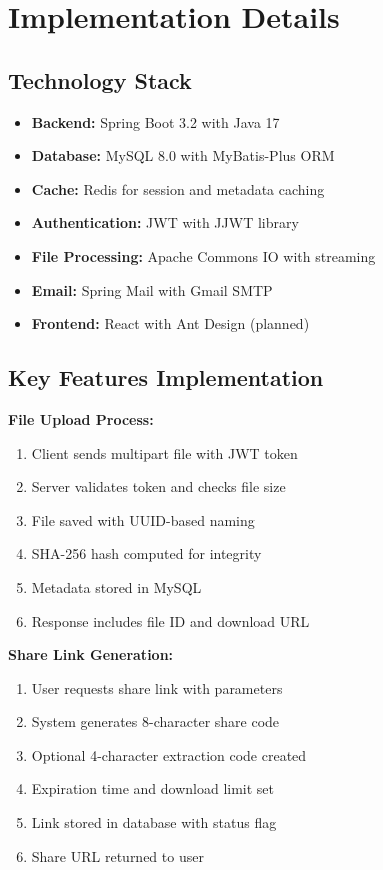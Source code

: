 \documentclass[final]{cvpr}
\begin{document}
\section{Implementation Details}

\subsection{Technology Stack}
\begin{itemize}
    \item \textbf{Backend:} Spring Boot 3.2 with Java 17
    \item \textbf{Database:} MySQL 8.0 with MyBatis-Plus ORM
    \item \textbf{Cache:} Redis for session and metadata caching
    \item \textbf{Authentication:} JWT with JJWT library
    \item \textbf{File Processing:} Apache Commons IO with streaming
    \item \textbf{Email:} Spring Mail with Gmail SMTP
    \item \textbf{Frontend:} React with Ant Design (planned)
\end{itemize}

\subsection{Key Features Implementation}

\textbf{File Upload Process:}
\begin{enumerate}
    \item Client sends multipart file with JWT token
    \item Server validates token and checks file size
    \item File saved with UUID-based naming
    \item SHA-256 hash computed for integrity
    \item Metadata stored in MySQL
    \item Response includes file ID and download URL
\end{enumerate}

\textbf{Share Link Generation:}
\begin{enumerate}
    \item User requests share link with parameters
    \item System generates 8-character share code
    \item Optional 4-character extraction code created
    \item Expiration time and download limit set
    \item Link stored in database with status flag
    \item Share URL returned to user
\end{enumerate}
\end{document}
